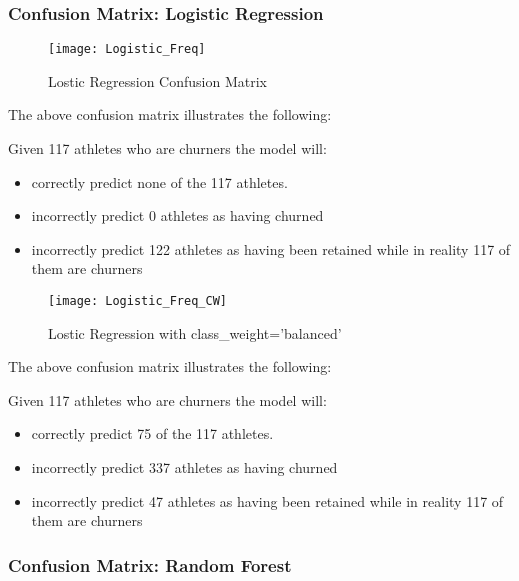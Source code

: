 \documentclass[
10pt, %
a4paper, %
oneside, %
headinclude,footinclude, %
BCOR5mm, %
]{scrartcl}
\begin{document}
\subsubsection{\textbf{Confusion Matrix}: Logistic Regression}

\begin{figure}[H]
\centering 
\texttt{[image: Logistic\_Freq]} 
\caption[Lostic Regression Confusion Matrix]{Lostic Regression Confusion Matrix} %
\label{fig:gallery} 
\end{figure}

The above confusion matrix illustrates the following: 

Given 117 athletes who are churners the model will:

\begin{itemize}
\item correctly predict none of the 117 athletes. 
\item incorrectly predict 0 athletes as having churned 
\item incorrectly predict 122 athletes as having been retained while in reality 117 of them are churners
\end{itemize}

\begin{figure}[H]
\centering 
\texttt{[image: Logistic\_Freq\_CW]} 
\caption[Lostic Regression Confusion Matrix]{Lostic Regression with class\_weight='balanced'} %
\label{fig:gallery} 
\end{figure}

The above confusion matrix illustrates the following: 

Given 117 athletes who are churners the model will:

\begin{itemize}
\item correctly predict 75 of the 117 athletes. 
\item incorrectly predict 337 athletes as having churned 
\item incorrectly predict 47 athletes as having been retained while in reality 117 of them are churners
\end{itemize}

\subsubsection{\textbf{Confusion Matrix}: Random Forest}
\end{document}
